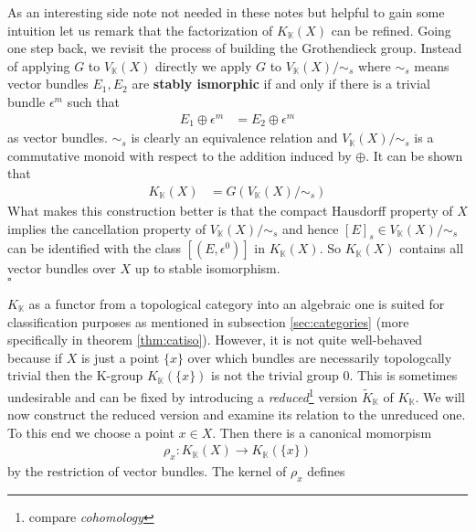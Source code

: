 \begin{rem}
\label{rem:stableiso}
As an interesting side note not needed in these notes but helpful to gain some intuition let us remark that the factorization of $K_{\mathbb{K}}(X)$ can be refined. Going one step back, we revisit the process of building the Grothendieck group. Instead of applying $G$ to $V_{\mathbb{K}}(X)$ directly we apply $G$ to $V_{\mathbb{K}}(X)/\sim_{s}$ where $\sim_{s}$ means vector bundles $E_{1},E_{2}$ are \textbf{stably ismorphic} if and only if there is a trivial bundle $\epsilon^{m}$ such that
\begin{align*}
  E_{1}
  \oplus
  \epsilon^{m}
  &=
  E_{2}
  \oplus
  \epsilon^{m}
\end{align*}
  as vector bundles. $\sim_{s}$ is clearly an equivalence relation and $V_{\mathbb{K}}(X)/\sim_{s}$ is a commutative monoid with respect to the addition induced by $\oplus$. It can be shown that \begin{align*}
  K_{\mathbb{K}}(X)
  &= G(V_{\mathbb{K}}(X)/\sim_{s})
\end{align*}
What makes this construction better is that the compact Hausdorff property of $X$ implies the cancellation property of $V_{\mathbb{K}}(X)/\sim_{s}$ and hence $[E]_{s} \in V_{\mathbb{K}}(X)/\sim_{s}$ can be identified with the class $[(E,\epsilon^{0})]$ in $K_{\mathbb{K}}(X)$. So $K_{\mathbb{K}}(X)$ contains all vector bundles over $X$ up to stable isomorphism.
\\
\phantom{proven}
\hfill
$\square$
\end{rem}
$K_{\mathbb{K}}$ as a functor from a topological category into an algebraic one is suited for classification purposes as mentioned in subsection \ref{sec:categories} (more specifically in theorem \ref{thm:catiso}). However, it is not quite well-behaved because if $X$ is just a point $\lbrace x \rbrace$ over which bundles are necessarily topologcally trivial then the K-group $K_{\mathbb{K}}(\lbrace x \rbrace)$ is not the trivial group $0$. This is sometimes undesirable and can be fixed by introducing a \textit{reduced}\footnote{compare \textit{cohomology}} version $\tilde{K}_{\mathbb{K}}$ of $K_{\mathbb{K}}$. We will now construct the reduced version and examine its relation to the unreduced one. To this end we choose a point $x \in X$. Then there is a canonical momorpism
\begin{align*}
  \rho_{x}
  \colon
  K_{\mathbb{K}}(X)
  \to
  K_{\mathbb{K}}(\lbrace x \rbrace)
\end{align*}
by the restriction of vector bundles. The kernel of $\rho_{x}$ defines
